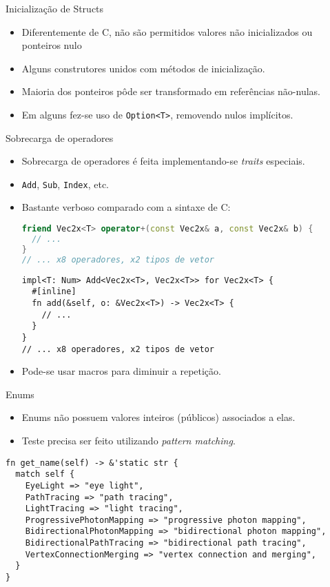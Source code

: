 \documentclass{beamer}
\def\Cpp{{C\nolinebreak[4]\raisebox{.2ex}{\scriptsize\bf++}}}
\begin{document}
\begin{frame}[fragile]{Inicialização de Structs}
	\begin{itemize}
		\item Diferentemente de \Cpp, não são permitidos valores não inicializados ou ponteiros nulo
		\item Alguns construtores unidos com métodos de inicialização.
		\item Maioria dos ponteiros pôde ser transformado em referências não-nulas.
		\item Em alguns fez-se uso de \texttt{Option<T>}, removendo nulos implícitos.
	\end{itemize}
\end{frame}

\begin{frame}[fragile]{Sobrecarga de operadores}
	\begin{itemize}
		\item Sobrecarga de operadores é feita implementando-se \emph{traits} especiais.
		\item \texttt{Add}, \texttt{Sub}, \texttt{Index}, etc.
		\item Bastante verboso comparado com a sintaxe de \Cpp:
		\begin{lstlisting}[language=C++]
friend Vec2x<T> operator+(const Vec2x& a, const Vec2x& b) {
  // ...
}
// ... x8 operadores, x2 tipos de vetor
		\end{lstlisting}
		\begin{lstlisting}
impl<T: Num> Add<Vec2x<T>, Vec2x<T>> for Vec2x<T> {
  #[inline]
  fn add(&self, o: &Vec2x<T>) -> Vec2x<T> {
    // ...
  }
}
// ... x8 operadores, x2 tipos de vetor
		\end{lstlisting}
		\item Pode-se usar macros para diminuir a repetição.
	\end{itemize}
\end{frame}

\begin{frame}[fragile]{Enums}
	\begin{itemize}
		\item Enums não possuem valores inteiros (públicos) associados a elas.
		\item Teste precisa ser feito utilizando \emph{pattern matching}.
	\end{itemize}

	\begin{lstlisting}
fn get_name(self) -> &'static str {
  match self {
    EyeLight => "eye light",
    PathTracing => "path tracing",
    LightTracing => "light tracing",
    ProgressivePhotonMapping => "progressive photon mapping",
    BidirectionalPhotonMapping => "bidirectional photon mapping",
    BidirectionalPathTracing => "bidirectional path tracing",
    VertexConnectionMerging => "vertex connection and merging",
  }
}
	\end{lstlisting}
\end{frame}
\end{document}
